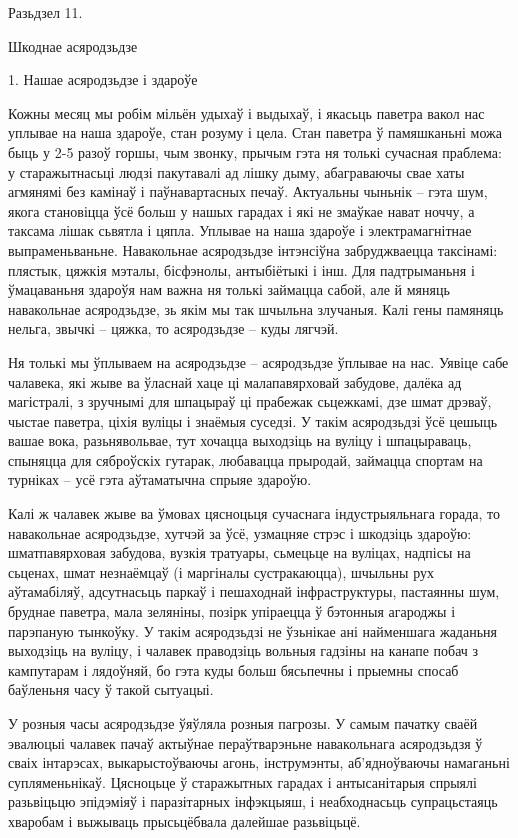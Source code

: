 Разьдзел 11. 

Шкоднае асяродзьдзе


1. Нашае асяродзьдзе і здароўе

Кожны месяц мы робім мільён удыхаў і выдыхаў, і якасьць паветра вакол нас уплывае на наша здароўе, стан розуму і цела. Стан паветра ў памяшканьні можа быць у 2-5 разоў горшы, чым звонку, прычым гэта ня толькі сучасная праблема: у старажытнасьці людзі пакутавалі ад лішку дыму, абаграваючы свае хаты агмянямі без камінаў і паўнавартасных печаў. Актуальны чыньнік – гэта шум, якога становіцца ўсё больш у нашых гарадах і які не змаўкае нават ноччу, а таксама лішак сьвятла і цяпла. Уплывае на наша здароўе і электрамагнітнае выпраменьваньне. Навакольнае асяродзьдзе інтэнсіўна забруджваецца таксінамі: плястык, цяжкія мэталы, бісфэнолы, антыбіётыкі і інш. Для падтрыманьня і ўмацаваньня здароўя нам важна ня толькі займацца сабой, але й мяняць навакольнае асяродзьдзе, зь якім мы так шчыльна злучаныя. Калі гены памяняць нельга, звычкі – цяжка, то асяродзьдзе – куды лягчэй.

Ня толькі мы ўплываем на асяродзьдзе – асяродзьдзе ўплывае на нас. Уявіце сабе чалавека, які жыве ва ўласнай хаце ці малапавярховай забудове, далёка ад магістралі, з зручнымі для шпацыраў ці прабежак сьцежкамі, дзе шмат дрэваў, чыстае паветра, ціхія вуліцы і знаёмыя суседзі. У такім асяродзьдзі ўсё цешыць вашае вока, разьнявольвае, тут хочацца выходзіць на вуліцу і шпацыраваць, спыняцца для сяброўскіх гутарак, любавацца прыродай, займацца спортам на турніках – усё гэта аўтаматычна спрыяе здароўю.

Калі ж чалавек жыве ва ўмовах цясноцьця сучаснага індустрыяльнага горада, то навакольнае асяродзьдзе, хутчэй за ўсё, узмацняе стрэс і шкодзіць здароўю: шматпавярховая забудова, вузкія тратуары, сьмецьце на вуліцах, надпісы на сьценах, шмат незнаёмцаў (і маргіналы сустракаюцца), шчыльны рух аўтамабіляў, адсутнасьць паркаў і пешаходнай інфраструктуры, пастаянны шум, бруднае паветра, мала зеляніны, позірк упіраецца ў бэтонныя агароджы і парэпаную тынкоўку. У такім асяродзьдзі не ўзьнікае ані найменшага жаданьня выходзіць на вуліцу, і чалавек праводзіць вольныя гадзіны на канапе побач з кампутарам і лядоўняй, бо гэта куды больш бясьпечны і прыемны спосаб баўленьня часу ў такой сытуацыі.

У розныя часы асяродзьдзе ўяўляла розныя пагрозы. У самым пачатку сваёй эвалюцыі чалавек пачаў актыўнае пераўтварэньне навакольнага асяродзьдзя ў сваіх інтарэсах, выкарыстоўваючы агонь, інструмэнты, аб'ядноўваючы намаганьні супляменьнікаў. Цясноцьце ў старажытных гарадах і антысанітарыя спрыялі разьвіцьцю эпідэміяў і паразітарных інфэкцыяш, і неабходнасьць супрацьстаяць хваробам і выжываць прысьцёбвала далейшае разьвіцьцё.

